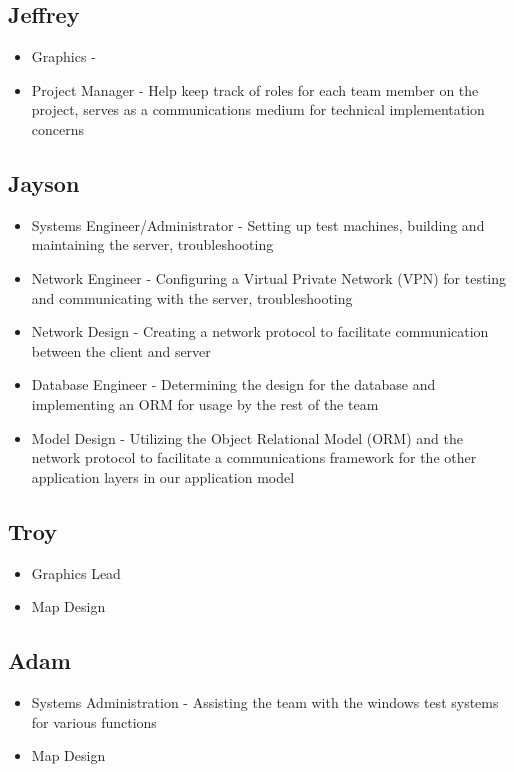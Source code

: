 \documentclass[12pt, a4paper, oneside]{article}
\begin{document}
\subsection*{Jeffrey}

\begin{itemize}
\item Graphics -
\item Project Manager - Help keep track of roles for each team member on the project, serves as a communications medium for technical implementation concerns
\end{itemize}

\subsection*{Jayson}

\begin{itemize}
\item Systems Engineer/Administrator - Setting up test machines, building and maintaining the server, troubleshooting
\item Network Engineer - Configuring a Virtual Private Network (VPN) for testing and communicating with the server, troubleshooting
\item Network Design - Creating a network protocol to facilitate communication between the client and server
\item Database Engineer - Determining the design for the database and implementing an ORM for usage by the rest of the team
\item Model Design - Utilizing the Object Relational Model (ORM) and the network protocol to facilitate a communications framework for the other application layers in our application model
\end{itemize}

\subsection*{Troy}

\begin{itemize}
\item Graphics Lead
\item Map Design
\end{itemize}

\subsection*{Adam}

\begin{itemize}
\item Systems Administration - Assisting the team with the windows test systems for various functions
\item Map Design
\end{itemize}
\end{document}
